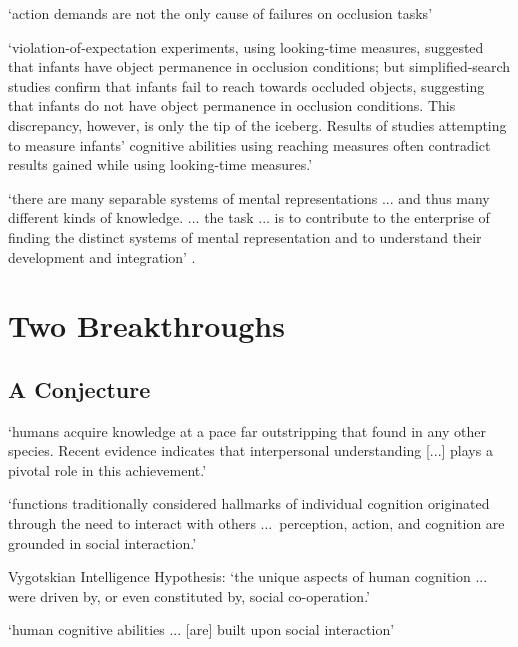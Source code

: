 \documentclass[12pt]{extarticle}
\begin{document}
\begin{multicols}{3}
‘action demands are not the only cause of failures on occlusion tasks’
\citep[p.\ 291]{shinskey:2012_disappearing}
 
‘violation-of-expectation experiments, using looking-time measures, suggested that infants have object permanence in occlusion conditions; but simplified-search studies confirm that infants fail to reach towards occluded objects, suggesting that infants do not have object permanence in occlusion conditions. This discrepancy, however, is only the tip of the iceberg. Results of studies attempting to measure infants’ cognitive abilities using reaching measures often contradict results gained while using looking-time measures.’ \citep[p.\ 994]{charles:2009_object}
 
‘there are many separable systems of mental representations ... and thus many different kinds of knowledge. ... the task ... is to contribute to the enterprise of finding the distinct systems of mental representation and to understand their development and integration’
\citep[p.\ 1522]{Hood:2000bf}.
 
 
 
\section{Two Breakthroughs}
 
\subsection{A Conjecture}
 
‘humans acquire knowledge at a pace far outstripping that found in any other species. Recent evidence indicates that interpersonal understanding [...] plays a pivotal role in this achievement.’
\citep[p.\ 40]{Baldwin:2000qq}
 
‘functions traditionally considered hallmarks of individual cognition originated through the need to interact with others ...\ perception, action, and cognition are grounded in social interaction.’
\citep[p.\ 103]{Knoblich:2006bn}
 
Vygotskian Intelligence Hypothesis:
‘the unique aspects of human cognition ... were driven by, or even constituted by, social co-operation.’
\citep[p.\ 1]{Moll:2007gu}
 
‘human cognitive abilities ... [are] built upon social interaction’
\citep{sinigaglia:2008_roots} %
 
 
\footnotesize 


\end{multicols}
\end{document}
